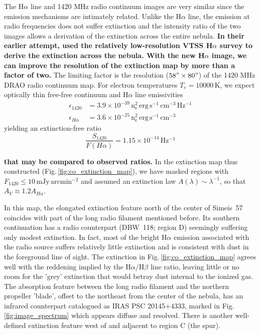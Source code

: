 \documentclass{aa}
\begin{document}
\par The H$\alpha$ line and 1420 MHz radio continuum images are very
similar since the emission mechanisms are intimately related.  Unlike
the H$\alpha$ line, the emission at radio frequencies does not suffer
extinction and the intensity ratio of the two images allows a
derivation of the extinction across the entire nebula.  \textbf{In
  their earlier attempt, \cite{israel2003} used the relatively
  low-resolution VTSS H$\alpha$ survey to derive the extinction across
  the nebula. With the new H$\alpha$ image, we can improve the
  resolution of the extinction map by more than a factor of two. }
  The limiting factor is the resolution ($58"\times 80"$) of the 1420
  MHz DRAO radio continuum map.  For electron temperatures
  $T_e=10000 \, \mathrm{K}$, we expect optically thin free-free
  continuum and H$\alpha$ line emissivities
\begin{equation}
\begin{split}
    \epsilon_{1420} &= 3.9 \times 10^{-39} \, \mathrm{n_e^2 \, erg \, s^{-1} \, cm^{-3}\, Hz^{-1}}\\
    \epsilon_{H\alpha} &= 3.6 \times 10^{-25} \, \mathrm{n_e^2 \, erg \, s^{-1} \, cm^{-3}}
\end{split}
    \label{eq:opticallythin1420}
  \end{equation}
yielding an extinction-free ratio
\begin{equation}
     \frac{S_{1420}}{F(H\alpha)} = 1.15\times 10^{-14}\, \mathrm{Hz^{-1}}
    \label{eq:relation_radio_Ha}
  \end{equation}


  \noindent \textbf{that may be compared to observed ratios.} In the
  extinction map thus constructed (Fig.\,\ref{fig:co_extinction_map}),
  we have masked regions with
  $F_{1420}\leq 10\, \mathrm{mJy \,arcmin^{-2}}$ and assumed an
  extinction law $A(\lambda)\sim \lambda^{-1}$, so that
  $A_V \approx 1.2 A_{H\alpha}$.
\par In this map, the elongated extinction feature north of the center
of Simeis~57 coincides with part of the long radio filament mentioned
before. Its southern continuation has a radio counterpart (DBW~118;
region D) seemingly suffering only modest extinction. In fact, most of
the bright H$\alpha$ emission associated with the radio source suffers
relatively little extinction and is consistent with dust in the
foreground line of sight. The extinction in
Fig.\,\ref{fig:co_extinction_map} agrees well with the reddening implied
by the H$\alpha$/H$\beta$ line ratio, leaving little or no room for
the 'grey' extinction that would betray dust internal to the ionized
gas.  The absorption feature between the long radio filament and the
northern propeller 'blade', offset to the northeast from the center of
the nebula, has an infrared counterpart catalogued as IRAS PSC
20145+4333, marked in Fig.\,\ref{fig:image_spectrum} which appears
diffuse and resolved.  There is another well-defined extinction
feature west of and adjacent to region C (the spur).
\end{document}
